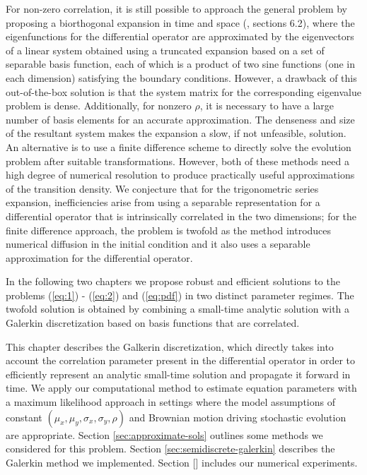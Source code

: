 For non-zero correlation, it is still possible to approach the general
problem by proposing a biorthogonal expansion in time and space
(\cite{risken1989fokker-planck}, sections 6.2), where the
eigenfunctions for the differential operator are approximated by the
eigenvectors of a linear system obtained using a truncated expansion
based on a set of separable basis function, each of which is a product
of two sine functions (one in each dimension) satisfying the boundary
conditions. However, a drawback of this out-of-the-box solution is
that the system matrix for the corresponding eigenvalue problem is
dense. Additionally, for nonzero $\rho$, it is necessary to have a
large number of basis elements for an accurate approximation. The
denseness and size of the resultant system makes the
expansion a slow, if not unfeasible, solution. An alternative is to
use a finite difference scheme to directly solve the evolution problem
after suitable transformations. However, both of these methods need a
high degree of numerical resolution to produce practically useful
approximations of the transition density. We conjecture that for the
trigonometric series expansion, inefficiencies arise from using a
separable representation for a differential operator that is
intrinsically correlated in the two dimensions; for the finite
difference approach, the problem is twofold as the method introduces
numerical diffusion in the initial condition and it also uses a
separable approximation for the differential operator.

In the following two chapters we propose robust and efficient
solutions to the problems (\ref{eq:1}) - (\ref{eq:2}) and
(\ref{eq:pdf}) in two distinct parameter regimes. The twofold solution
is obtained by combining a small-time analytic solution with a
Galerkin discretization based on basis functions that are
correlated.

This chapter describes the Galkerin discretization, which directly
takes into account the correlation parameter present in the
differential operator in order to efficiently represent an analytic
small-time solution and propagate it forward in time. We apply our
computational method to estimate equation parameters with a maximum
likelihood approach in settings where the model assumptions of
constant $(\mu_x, \mu_y, \sigma_x, \sigma_y, \rho)$ and Brownian
motion driving stochastic evolution are appropriate. Section
\ref{sec:approximate-sols} outlines some methods we considered for
this problem. Section \ref{sec:semidiscrete-galerkin} describes the
Galerkin method we implemented. Section [] includes our numerical
experiments.


